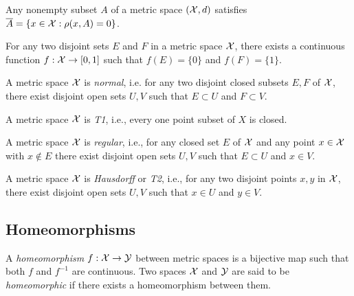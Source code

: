 \begin{lem}
  \label{lem:defineClosureFromDistance}
  Any nonempty subset $A$ of a metric space $({\cal X},d)$
  satisfies $\overline{A}=\{x\in{\cal X}: \rho(x,A)=0\}$.
\end{lem}

\begin{lem}
  \label{lem:separateClosedSets}
  For any two disjoint sets $E$ and $F$
  in a metric space ${\cal X}$,
  there exists a continuous function $f:{\cal X}\rightarrow [0,1]$
  such that $f(E)=\{0\}$ and $f(F)=\{1\}$.
\end{lem}

\begin{coro}
  \label{coro:metricSpaceIsNormal}
  A metric space ${\cal X}$ is \emph{normal},
  i.e.
  for any two disjoint closed subsets $E,F$ of ${\cal X}$,
  there exist disjoint open sets $U,V$
  such that $E\subset U$ and $F\subset V$.
\end{coro}

\begin{coro}
  \label{coro:metricSpaceIsT1}
  A metric space ${\cal X}$ is \emph{T1},
  i.e., every one point subset of $X$ is closed.
\end{coro}

\begin{coro}
  \label{coro:metricSpaceIsRegular}
  A metric space ${\cal X}$ is \emph{regular},
  i.e., 
  for any closed set $E$ of ${\cal X}$
  and any point $x\in{\cal X}$ with $x\not\in E$
  there exist disjoint open sets $U,V$
  such that $E\subset U$ and $x\in V$.
\end{coro}

\begin{coro}
  \label{coro:metricSpaceIsT2}
  A metric space ${\cal X}$ is \emph{Hausdorff} or \emph{T2},
  i.e., 
  for any two disjoint points $x,y$ in ${\cal X}$,
  there exist disjoint open sets $U,V$
  such that $x\in U$ and $y\in V$.
\end{coro}


\subsection{Homeomorphisms}
\label{sec:homeomorphisms}

\begin{defn}
  A \emph{homeomorphism} $f:{\cal X}\rightarrow {\cal Y}$
  between metric spaces
  is a bijective map such that both $f$ and $f^{-1}$
  are continuous.
  Two spaces ${\cal X}$ and ${\cal Y}$
  are said to be \emph{homeomorphic}
  if there exists a homeomorphism between them.
\end{defn}


